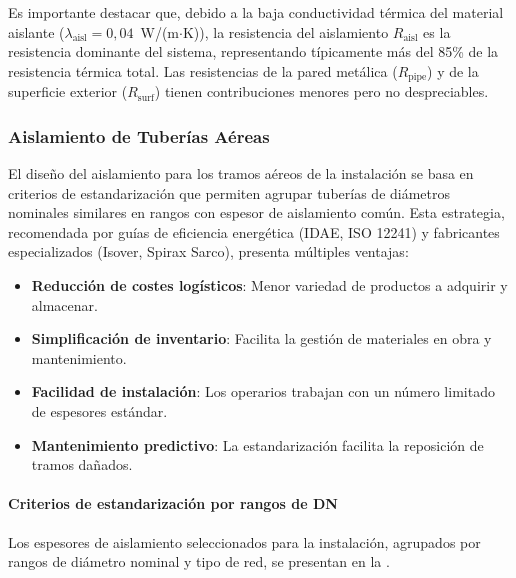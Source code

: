 \documentclass[12pt]{article}
\begin{document}
Es importante destacar que, debido a la baja conductividad térmica del material aislante ($\lambda_{\text{aisl}} = 0{,}04$~W/(m$\cdot$K)), la resistencia del aislamiento $R_{\text{aisl}}$ es la resistencia dominante del sistema, representando típicamente más del 85\% de la resistencia térmica total. Las resistencias de la pared metálica ($R_{\text{pipe}}$) y de la superficie exterior ($R_{\text{surf}}$) tienen contribuciones menores pero no despreciables.


\subsubsection{Aislamiento de Tuberías Aéreas}
\label{subsubsec:aislamiento_aereo}

El diseño del aislamiento para los tramos aéreos de la instalación se basa en criterios de estandarización que permiten agrupar tuberías de diámetros nominales similares en rangos con espesor de aislamiento común. Esta estrategia, recomendada por guías de eficiencia energética (IDAE, ISO 12241) y fabricantes especializados (Isover, Spirax Sarco), presenta múltiples ventajas:

\begin{itemize}[noitemsep]
	\item \textbf{Reducción de costes logísticos}: Menor variedad de productos a adquirir y almacenar.
	\item \textbf{Simplificación de inventario}: Facilita la gestión de materiales en obra y mantenimiento.
	\item \textbf{Facilidad de instalación}: Los operarios trabajan con un número limitado de espesores estándar.
	\item \textbf{Mantenimiento predictivo}: La estandarización facilita la reposición de tramos dañados.
\end{itemize}

\paragraph{Criterios de estandarización por rangos de DN}
\label{par:rangos_estandarizados}

Los espesores de aislamiento seleccionados para la instalación, agrupados por rangos de diámetro nominal y tipo de red, se presentan en la .
\end{document}
